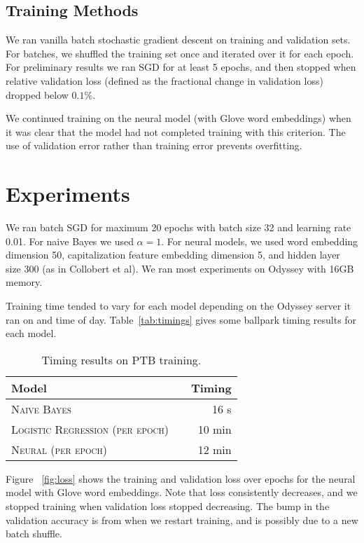 \documentclass[11pt]{article}
\begin{document}
\subsection{Training Methods}

We ran vanilla batch stochastic gradient descent on training and validation sets. For batches, we shuffled the training set once and iterated over it for each epoch. For preliminary results we ran SGD for at least 5 epochs, and then stopped when relative validation loss (defined as the fractional change in validation loss) dropped below $0.1\%$.

We continued training on the neural model (with Glove word embeddings) when it was clear that the model had not completed training with this criterion. The use of validation error rather than training error prevents overfitting.

\section{Experiments}

We ran batch SGD for maximum 20 epochs with batch size 32 and learning rate 0.01. For naive Bayes we used $\alpha = 1$. For neural models, we used word embedding dimension 50, capitalization feature embedding dimension 5, and hidden layer size 300 (as in Collobert et al). We ran most experiments on Odyssey with 16GB memory.

Training time tended to vary for each model depending on the Odyssey server it ran on and time of day. Table~\ref{tab:timings} gives some ballpark timing results for each model.

\begin{table}[h]
\centering
\begin{tabular}{llr}
 \toprule
 Model &  & Timing \\
 \midrule
 \textsc{Naive Bayes} & & 16 s\\
 \textsc{Logistic Regression (per epoch)} & & 10 min \\
 \textsc{Neural (per epoch)} & &12 min \\
 \bottomrule
\end{tabular}
\caption{\label{tab:timing} Timing results on PTB training.}
\end{table}


Figure ~\ref{fig:loss} shows the training and validation loss over epochs for the neural model with Glove word embeddings. Note that loss consistently decreases, and we stopped training when validation loss stopped decreasing. The bump in the validation accuracy is from when we restart training, and is possibly due to a new batch shuffle.
\end{document}
